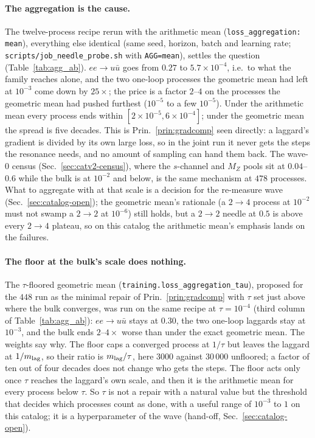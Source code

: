 \documentclass[11pt]{article}
\newcommand{\code}[1]{\texttt{#1}}
\begin{document}
\paragraph{The aggregation is the cause.} The twelve-process recipe rerun with the
arithmetic mean (\code{loss\_aggregation: mean}), everything else identical (same seed,
horizon, batch and learning rate; \code{scripts/job\_needle\_probe.sh} with \code{AGG=mean}),
settles the question (Table~\ref{tab:agg_ab}). $ee\to u\bar u$ goes from $0.27$ to
$5.7\times10^{-4}$, i.e.\ to what the family reaches alone, and the two one-loop processes
the geometric mean had left at $10^{-3}$ come down by $25\times$; the price is a factor
$2$--$4$ on the processes the geometric mean had pushed furthest ($10^{-5}$ to a few
$10^{-5}$). Under the arithmetic mean every process ends within $[2\times10^{-5},
6\times10^{-4}]$; under the geometric mean the spread is five decades. This is
Prin.~\ref{prin:gradcomp} seen directly: a laggard's gradient is divided by its own large
loss, so in the joint run it never gets the steps the resonance needs, and no amount of sampling
can hand them back. The wave-0 census (Sec.~\ref{sec:catv2-census}), where the $s$-channel and $M_Z$ pools sit at $0.04$--$0.6$ while the bulk is at $10^{-2}$ and below,
is the same mechanism at $478$ processes. What to aggregate with at that scale is a decision
for the re-measure wave (Sec.~\ref{sec:catalog-open}); the geometric mean's rationale (a
$2\to4$ process at $10^{-2}$ must not swamp a $2\to2$ at $10^{-6}$) still holds, but a
$2\to2$ needle at $0.5$ is above every $2\to4$ plateau, so on this catalog the arithmetic
mean's emphasis lands on the failures.

\paragraph{The floor at the bulk's scale does nothing.} The $\tau$-floored geometric mean
(\code{training.loss\_aggregation\_tau}), proposed for the $448$ run as the minimal repair of
Prin.~\ref{prin:gradcomp} with $\tau$ set just above where the bulk converges, was run on the
same recipe at $\tau=10^{-4}$ (third column of Table~\ref{tab:agg_ab}): $ee\to u\bar u$ stays at
$0.30$, the two one-loop laggards stay at $10^{-3}$, and the bulk ends $2$--$4\times$ worse
than under the exact geometric mean. The weights say why. The floor caps a converged process
at $1/\tau$ but leaves the laggard at $1/m_{\rm lag}$, so their ratio is $m_{\rm lag}/\tau$,
here $3000$ against $30\,000$ unfloored; a factor of ten out of four decades does not change
who gets the steps. The floor acts only once $\tau$ reaches the laggard's own scale, and then
it is the arithmetic mean for every process below $\tau$. So $\tau$ is not a repair with a
natural value but the threshold that decides which processes count as done, with a useful
range of $10^{-3}$ to $1$ on this catalog; it is a hyperparameter of the wave (hand-off,
Sec.~\ref{sec:catalog-open}).
\end{document}
